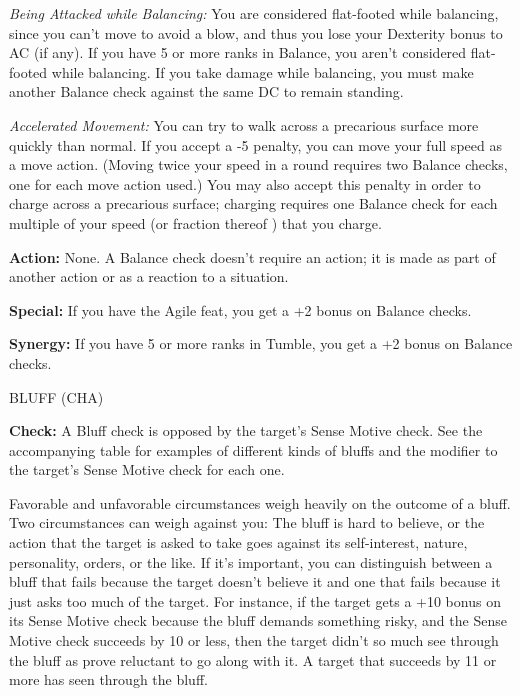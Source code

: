 \documentclass{article}
\begin{document}
\vspace{12pt}
\textit{Being Attacked while Balancing: }You are considered flat-footed while balancing, 
since you can't move to avoid a blow, and thus you lose your Dexterity bonus to 
AC (if any). If you have 5 or more ranks in Balance, you aren't considered flat-footed 
while balancing. If you take damage while balancing, you must make another Balance 
check against the same DC to remain standing.

\textit{Accelerated Movement: }You can try to walk across a precarious surface 
more quickly than normal. If you accept a -5 penalty, you can move your full speed 
as a move action. (Moving twice your speed in a round requires two Balance checks, 
one for each move action used.) You may also accept this penalty in order to charge 
across a precarious surface; charging requires one Balance check for each multiple 
of your speed (or fraction thereof ) that you charge.

\textbf{Action:} None. A Balance check doesn't require an action; it is made as 
part of another action or as a reaction to a situation.

\textbf{Special:} If you have the Agile feat, you get a +2 bonus on Balance checks.

\textbf{Synergy:} If you have 5 or more ranks in Tumble, you get a +2 bonus on 
Balance checks.

\vspace{12pt}
BLUFF (CHA)

\textbf{Check:} A Bluff check is opposed by the target's Sense Motive check. See 
the accompanying table for examples of different kinds of bluffs and the modifier 
to the target's Sense Motive check for each one.

Favorable and unfavorable circumstances weigh heavily on the outcome of a bluff. 
Two circumstances can weigh against you: The bluff is hard to believe, or the action 
that the target is asked to take goes against its self-interest, nature, personality, 
orders, or the like. If it's important, you can distinguish between a bluff that 
fails because the target doesn't believe it and one that fails because it just 
asks too much of the target. For instance, if the target gets a +10 bonus on its 
Sense Motive check because the bluff demands something risky, and the Sense Motive 
check succeeds by 10 or less, then the target didn't so much see through the bluff 
as prove reluctant to go along with it. A target that succeeds by 11 or more has 
seen through the bluff.
\end{document}
